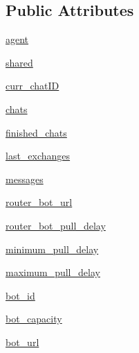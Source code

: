 \subsection*{Public Attributes}
\begin{DoxyCompactItemize}
\item 
\hyperlink{classprojects_1_1convai_1_1convai__world_1_1ConvAIWorld_a77dfb285968a495ecafb14ef51c18875}{agent}
\item 
\hyperlink{classprojects_1_1convai_1_1convai__world_1_1ConvAIWorld_a77e455138f285c6edaf494890a5dc774}{shared}
\item 
\hyperlink{classprojects_1_1convai_1_1convai__world_1_1ConvAIWorld_a0409d8753dc8b224e2d82d61f55d9649}{curr\+\_\+chat\+ID}
\item 
\hyperlink{classprojects_1_1convai_1_1convai__world_1_1ConvAIWorld_a5c88526f20ed9a6cd208cd785e0fe0bd}{chats}
\item 
\hyperlink{classprojects_1_1convai_1_1convai__world_1_1ConvAIWorld_af9e2e582ada0c6c11429ebb570020a4f}{finished\+\_\+chats}
\item 
\hyperlink{classprojects_1_1convai_1_1convai__world_1_1ConvAIWorld_a71d95ef6fe8ebae74f96cd23d9b7f1cc}{last\+\_\+exchanges}
\item 
\hyperlink{classprojects_1_1convai_1_1convai__world_1_1ConvAIWorld_abf4bbf884ded213cee5e321fc7ef6ab0}{messages}
\item 
\hyperlink{classprojects_1_1convai_1_1convai__world_1_1ConvAIWorld_ac321185eb32490473ae3c5eebd941f82}{router\+\_\+bot\+\_\+url}
\item 
\hyperlink{classprojects_1_1convai_1_1convai__world_1_1ConvAIWorld_a10f515b04f784555f890a17b0678523f}{router\+\_\+bot\+\_\+pull\+\_\+delay}
\item 
\hyperlink{classprojects_1_1convai_1_1convai__world_1_1ConvAIWorld_a5939f257ad5bc1ac6646d92270a81dc3}{minimum\+\_\+pull\+\_\+delay}
\item 
\hyperlink{classprojects_1_1convai_1_1convai__world_1_1ConvAIWorld_aa885a0300a1954e56112b061ecc83d93}{maximum\+\_\+pull\+\_\+delay}
\item 
\hyperlink{classprojects_1_1convai_1_1convai__world_1_1ConvAIWorld_a8aa040dba1718e499ff1835b6673e639}{bot\+\_\+id}
\item 
\hyperlink{classprojects_1_1convai_1_1convai__world_1_1ConvAIWorld_a1df7a409e02fb136328472d5399aae55}{bot\+\_\+capacity}
\item 
\hyperlink{classprojects_1_1convai_1_1convai__world_1_1ConvAIWorld_ac7caf92990b225bb4c88e9e37e23aad3}{bot\+\_\+url}
\end{DoxyCompactItemize}


